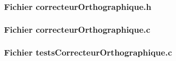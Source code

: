 		\subsubsection{Fichier correcteurOrthographique.h}
			
			
		\subsubsection{Fichier correcteurOrthographique.c}
			
		\subsubsection{Fichier testsCorrecteurOrthographique.c}
			

